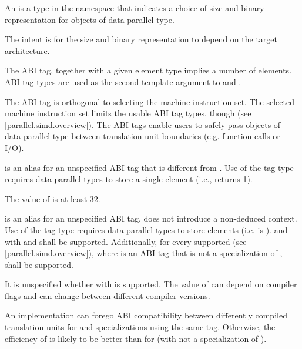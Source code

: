 \pnum
An  is a type in the  namespace that indicates a choice of size and binary representation for objects of data-parallel type. \begin{note}The intent is for the size and binary representation to depend on the target architecture.\end{note} The ABI tag, together with a given element type implies a number of elements. ABI tag types are used as the second template argument to  and .

\pnum
\begin{note}The ABI tag is orthogonal to selecting the machine instruction set. The selected machine instruction set limits the usable ABI tag types, though (see \ref{parallel.simd.overview}). The ABI tags enable users to safely pass objects of data-parallel type between translation unit boundaries (e.g. function calls or I/O).\end{note}

\pnum
{} is an alias for an unspecified ABI tag that is different from .
Use of the  tag type requires data-parallel types to store a single element (i.e.,  returns 1).

\pnum
The value of  is at least 32.

\pnum
{} is an alias for an unspecified ABI tag.
 does not introduce a non-deduced context.
Use of the  tag type requires data-parallel types to store  elements (i.e.  is ).  and  with  and  shall be supported. Additionally, for every supported  (see \ref{parallel.simd.overview}), where  is an ABI tag that is not a specialization of ,  shall be supported.

\pnum
\begin{note}It is unspecified whether  with  is supported. The value of  can depend on compiler flags and can change between different compiler versions.\end{note}

\pnum
\begin{note}An implementation can forego ABI compatibility between differently compiled translation units for  and  specializations using the same  tag. Otherwise, the efficiency of  is likely to be better than for  (with  not a specialization of ).\end{note}

